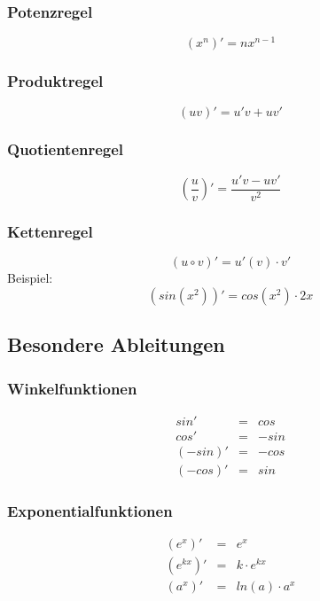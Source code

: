 \subsubsection{Potenzregel}
\label{ssub:potenzregel}
\begin{equation}
	(x^n)' = nx^{n-1} 
\end{equation}

\subsubsection{Produktregel}
\label{ssub:produktregel}
\begin{equation}
	(uv)' = u'v + uv'
\end{equation}	

\subsubsection{Quotientenregel}
\label{ssub:quotientenregel}
\begin{equation}
	\left(\frac{u}{v}\right)' = \frac{u'v - uv'}{v^2}
\end{equation}

\subsubsection{Kettenregel}
\label{ssub:kettenregel}
\begin{equation}
	(u \circ v)' = u'(v) \cdot v'
\end{equation}
Beispiel:
\begin{displaymath}
	(sin(x^2))' = cos(x^2) \cdot 2x
\end{displaymath}

\subsection{Besondere Ableitungen} 
\label{sub:besondere_ableitungen}

\subsubsection{Winkelfunktionen}
\label{ssub:winkelfunktionen}	
\begin{eqnarray}
	sin' &=& cos \\
	cos' &=& -sin \\
	(-sin)' &=& -cos \\
	(-cos)' &=& sin
\end{eqnarray}

\subsubsection{Exponentialfunktionen}
\label{ssub:exponentialfunktionen}	
\begin{eqnarray}
	(e^x)' &=& e^x \\
	(e^{kx})' &=& k \cdot e^{kx} \\
	(a^x)' &=& ln(a) \cdot a^x
\end{eqnarray}

